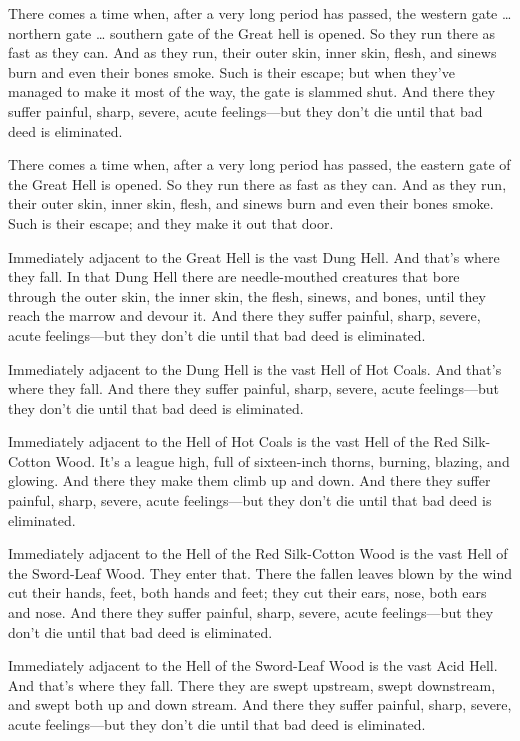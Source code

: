 \documentclass[12pt,openany]{book}%
\begin{document}
There comes a time when, after a very long period has passed, the western gate … northern gate … southern gate of the Great hell is opened. So they run there as fast as they can. And as they run, their outer skin, inner skin, flesh, and sinews burn and even their bones smoke. Such is their escape; but when they’ve managed to make it most of the way, the gate is slammed shut. And there they suffer painful, sharp, severe, acute feelings—but they don’t die until that bad deed is eliminated. 

There comes a time when, after a very long period has passed, the eastern gate of the Great Hell is opened. So they run there as fast as they can. And as they run, their outer skin, inner skin, flesh, and sinews burn and even their bones smoke. Such is their escape; and they make it out that door. 

Immediately adjacent to the Great Hell is the vast Dung Hell. And that’s where they fall. In that Dung Hell there are needle-mouthed creatures that bore through the outer skin, the inner skin, the flesh, sinews, and bones, until they reach the marrow and devour it. And there they suffer painful, sharp, severe, acute feelings—but they don’t die until that bad deed is eliminated. 

Immediately adjacent to the Dung Hell is the vast Hell of Hot Coals. And that’s where they fall. And there they suffer painful, sharp, severe, acute feelings—but they don’t die until that bad deed is eliminated. 

Immediately adjacent to the Hell of Hot Coals is the vast Hell of the Red Silk-Cotton Wood. It’s a league high, full of sixteen-inch thorns, burning, blazing, and glowing. And there they make them climb up and down. And there they suffer painful, sharp, severe, acute feelings—but they don’t die until that bad deed is eliminated. 

Immediately adjacent to the Hell of the Red Silk-Cotton Wood is the vast Hell of the Sword-Leaf Wood. They enter that. There the fallen leaves blown by the wind cut their hands, feet, both hands and feet; they cut their ears, nose, both ears and nose. And there they suffer painful, sharp, severe, acute feelings—but they don’t die until that bad deed is eliminated. 

Immediately adjacent to the Hell of the Sword-Leaf Wood is the vast Acid Hell. And that’s where they fall. There they are swept upstream, swept downstream, and swept both up and down stream. And there they suffer painful, sharp, severe, acute feelings—but they don’t die until that bad deed is eliminated. 
\end{document}
